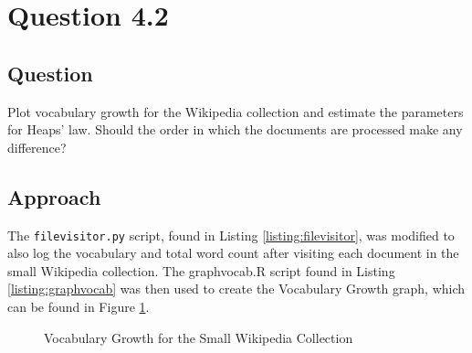 \section{Question 4.2}

\subsection{Question}
Plot vocabulary growth for the Wikipedia collection and estimate the parameters for Heaps' law. Should the order in which the documents are processed make any difference?

\subsection{Approach}
The \texttt{filevisitor.py} script, found in Listing \ref{listing:filevisitor}, was modified to also log the vocabulary and total word count after visiting each document in the small Wikipedia collection.  The graphvocab.R script found in Listing \ref{listing:graphvocab} was then used to create the Vocabulary Growth graph, which can be found in Figure \ref{fig:vocab}.

\begin{figure}[h!]
\centering
\label{fig:vocab}
\caption{Vocabulary Growth for the Small Wikipedia Collection}
\end{figure}